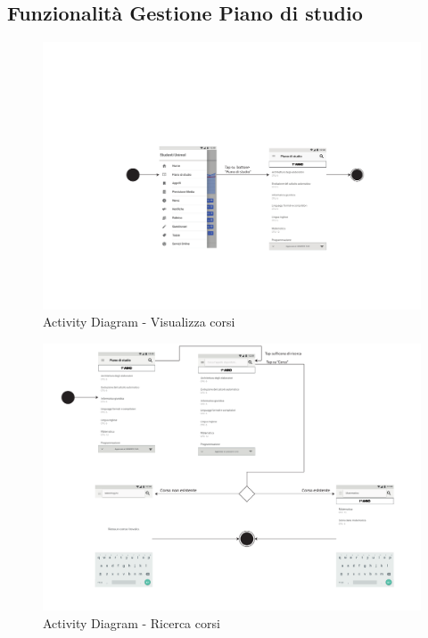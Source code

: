 \subsection{Funzionalità Gestione Piano di studio}
\begin{figure}[h]
	\centering
	\includegraphics[width=6in]{imgs/gruppo1/activity_diagrams/AD1_Visualizza_corsi.pdf}
	\caption{Activity Diagram - Visualizza corsi}
	\label{diag:visualizzaCorsiAD}
\end{figure}
\newpage

\begin{figure}[h]
	\centering
	\includegraphics[width=6in]{imgs/gruppo1/activity_diagrams/AD2_ricerca_corsi.pdf}
	\caption{Activity Diagram - Ricerca corsi}
	\label{diag:ricercaCorsiAD}
\end{figure}
\newpage

